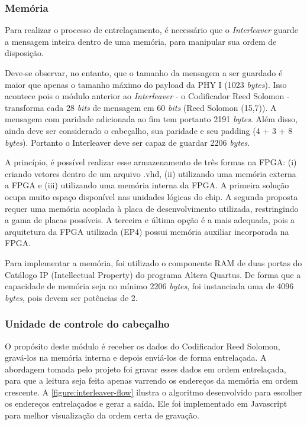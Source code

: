 	\subsubsection{Memória}
	
	Para realizar o processo de entrelaçamento, é necessário que o \textit{Interleaver} guarde a mensagem inteira dentro de uma memória, para manipular sua ordem de disposição. 
	
	Deve-se observar, no entanto, que o tamanho da mensagem a ser guardado é maior que apenas o tamanho máximo do payload da PHY I (1023 \textit{bytes}). Isso acontece pois o módulo anterior ao \textit{Interleaver} - o Codificador Reed Solomon - transforma cada 28 \textit{bits} de mensagem em 60 \textit{bits} (Reed Solomon (15,7)). A mensagem com paridade adicionada ao fim tem portanto 2191 \textit{bytes}. Além disso, ainda deve ser considerado o cabeçalho, sua paridade e seu padding (4 + 3 + 8 \textit{bytes}). Portanto o Interleaver deve ser capaz de guardar 2206 \textit{bytes}.
	
	A princípio, é possível realizar esse armazenamento de três formas na FPGA: (i) criando vetores dentro de um arquivo .vhd, (ii) utilizando uma memória externa a FPGA e (iii) utilizando uma memória interna da FPGA. A primeira solução ocupa muito espaço disponível nas unidades lógicas do chip. A segunda proposta requer uma memória acoplada à placa de desenvolvimento utilizada, restringindo a gama de placas possíveis. A terceira e última opção é a mais adequada, pois a arquitetura da FPGA utilizada (EP4) possui memória auxiliar incorporada na FPGA.
	
	Para implementar a memória, foi utilizado o componente RAM de duas portas do Catálogo IP (Intellectual Property) do programa Altera Quartus. De forma que a capacidade de memória seja no mínimo 2206 \textit{bytes}, foi instanciada uma de 4096 \textit{bytes}, pois devem ser potências de 2.

	\subsubsection{Unidade de controle do cabeçalho}\label{section:interleaver-header-control}
	
	O propósito deste módulo é receber os dados do Codificador Reed Solomon, gravá-los na memória interna e depois enviá-los de forma entrelaçada. A abordagem tomada pelo projeto foi gravar esses dados em ordem entrelaçada, para que a leitura seja feita apenas varrendo os endereços da memória em ordem crescente. A \autoref{figure:interleaver-flow} ilustra o algoritmo desenvolvido para escolher os endereços entrelaçados e gerar a saída. Ele foi implementado em Javascript para melhor visualização da ordem certa de gravação.

